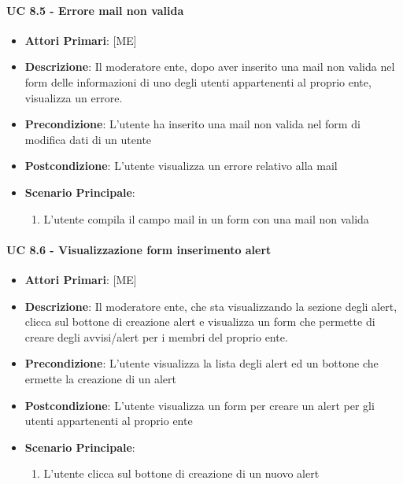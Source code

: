 			\paragraph{UC 8.5 - Errore mail non valida}
			\begin{itemize}
				\item \textbf{Attori Primari}: [ME] 
				\item \textbf{Descrizione}: Il moderatore ente, dopo aver inserito una mail non valida nel form delle informazioni di uno degli utenti appartenenti al proprio ente, visualizza un errore.
				\item \textbf{Precondizione}: L'utente ha inserito una mail non valida nel form di modifica dati di un utente 
				\item \textbf{Postcondizione}: L'utente visualizza un errore relativo alla mail
				\item \textbf{Scenario Principale}:
				\begin{enumerate}
					\item{L'utente compila il campo mail in un form con una mail non valida}
				\end{enumerate}	
			\end{itemize}

			\paragraph{UC 8.6 - Visualizzazione form inserimento alert}
			\begin{itemize}
				\item \textbf{Attori Primari}: [ME]
				\item \textbf{Descrizione}: Il moderatore ente, che sta visualizzando la sezione degli alert, clicca sul bottone di creazione alert e visualizza un form che permette di creare degli avvisi/alert per i membri del proprio ente.
				\item \textbf{Precondizione}: L'utente visualizza la lista degli alert ed un bottone che ermette la creazione di un alert
				\item \textbf{Postcondizione}: L'utente visualizza un form per creare un alert per gli utenti appartenenti al proprio ente 
				\item \textbf{Scenario Principale}:
				\begin{enumerate}
					\item{L'utente clicca sul bottone di creazione di un nuovo alert}
				\end{enumerate}	
			\end{itemize}

